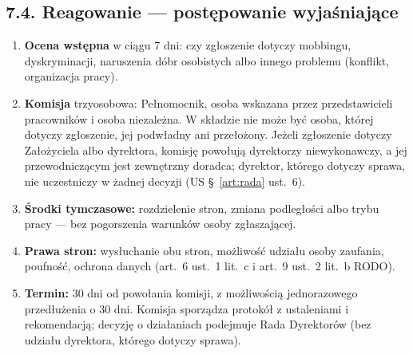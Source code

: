 \documentclass[11pt,a4paper]{report}
\newcommand{\US}[1]{US §~#1}
\begin{document}
\subsection*{7.4. Reagowanie --- postępowanie wyjaśniające}
\begin{enumerate}
  \item \textbf{Ocena wstępna} w ciągu 7 dni: czy zgłoszenie dotyczy mobbingu, dyskryminacji, naruszenia dóbr osobistych albo innego problemu (konflikt, organizacja pracy).
  \item \textbf{Komisja} trzyosobowa: Pełnomocnik, osoba wskazana przez przedstawicieli pracowników i osoba niezależna. W składzie nie może być osoba, której dotyczy zgłoszenie, jej podwładny ani przełożony. Jeżeli zgłoszenie dotyczy Założyciela albo dyrektora, komisję powołują dyrektorzy niewykonawczy, a jej przewodniczącym jest zewnętrzny doradca; dyrektor, którego dotyczy sprawa, nie uczestniczy w żadnej decyzji (\US{\ref{art:rada} ust.~6}).
  \item \textbf{Środki tymczasowe:} rozdzielenie stron, zmiana podległości albo trybu pracy --- bez pogorszenia warunków osoby zgłaszającej.
  \item \textbf{Prawa stron:} wysłuchanie obu stron, możliwość udziału osoby zaufania, poufność, ochrona danych (art.~6 ust.~1 lit.~c i art.~9 ust.~2 lit.~b RODO).
  \item \textbf{Termin:} 30 dni od powołania komisji, z możliwością jednorazowego przedłużenia o 30 dni. Komisja sporządza protokół z ustaleniami i rekomendacją; decyzję o działaniach podejmuje Rada Dyrektorów (bez udziału dyrektora, którego dotyczy sprawa).
\end{enumerate}
\end{document}
